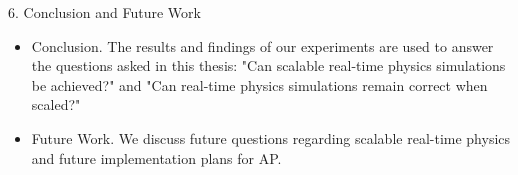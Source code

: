 6. Conclusion and Future Work
\begin{itemize}
	\item Conclusion. The results and findings of our experiments are used to answer the questions asked in this thesis: "Can scalable real-time physics simulations be achieved?" and "Can real-time physics simulations remain correct when scaled?"
	\item Future Work. We discuss future questions regarding scalable real-time physics and future implementation plans for AP.
\end{itemize}

